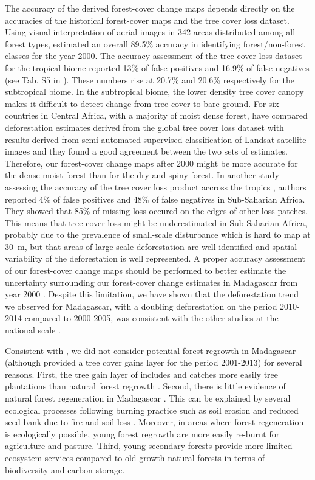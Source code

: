 \documentclass[essd, classical]{copernicus}
\begin{document}
The accuracy of the derived forest-cover change maps depends directly
on the accuracies of the historical forest-cover maps and the tree
cover loss dataset. Using visual-interpretation of aerial images in
342 areas distributed among all forest types, \citet{Harper2007}
estimated an overall 89.5\% accuracy in identifying forest/non-forest
classes for the year 2000. The accuracy assessment of the tree cover
loss dataset for the tropical biome reported 13\% of false positives
and 16.9\% of false negatives (see Tab. S5 in
\citet{Hansen2013}). These numbers rise at 20.7\% and 20.6\%
respectively for the subtropical biome. In the subtropical biome, the
lower density tree cover canopy makes it difficult to detect change
from tree cover to bare ground. For six countries in Central Africa,
with a majority of moist dense forest, \citet{Verhegghen2016} have
compared deforestation estimates derived from the global tree cover
loss dataset \citep{Hansen2013} with results derived from
semi-automated supervised classification of Landsat satellite images
\citep{Achard2014} and they found a good agreement between the two
sets of estimates. Therefore, our forest-cover change maps after 2000
might be more accurate for the dense moist forest than for the dry and
spiny forest. In another study assessing the accuracy of the tree
cover loss product accross the tropics \citep{Tyukavina2015}, authors
reported 4\% of false positives and 48\% of false negatives in
Sub-Saharian Africa. They showed that 85\% of missing loss occured on
the edges of other loss patches. This means that tree cover loss might
be underestimated in Sub-Saharian Africa, probably due to the
prevalence of small-scale disturbance which is hard to map at 30~m,
but that areas of large-scale deforestation are well identified and
spatial variability of the deforestation is well represented. A proper
accuracy assessment of our forest-cover change maps should be
performed to better estimate the uncertainty surrounding our
forest-cover change estimates in Madagascar from year 2000
\citep{Olofsson2013,Olofsson2014}. Despite this limitation, we have
shown that the deforestation trend we observed for Madagascar, with a
doubling deforestation on the period 2010-2014 compared to 2000-2005,
was consistent with the other studies at the national scale
\citep{ONE2015, MEFT2009}.

Consistent with \citet{Harper2007}, we did not consider potential
forest regrowth in Madagascar (although \citet{Hansen2013} provided a
tree cover gains layer for the period 2001-2013) for several
reasons. First, the tree gain layer of \citet{Hansen2013} includes and
catches more easily tree plantations than natural forest regrowth
\citep{Tropek2014}. Second, there is little evidence of natural forest
regeneration in Madagascar \citep{Grouzis2001, Harper2007}. This can
be explained by several ecological processes following burning
practice such as soil erosion \citep{Grinand2017} and reduced seed
bank due to fire and soil loss \citep{Grouzis2001}. Moreover, in areas
where forest regeneration is ecologically possible, young forest
regrowth are more easily re-burnt for agriculture and pasture. Third,
young secondary forests provide more limited ecosystem services
compared to old-growth natural forests in terms of biodiversity and
carbon storage.
\end{document}
